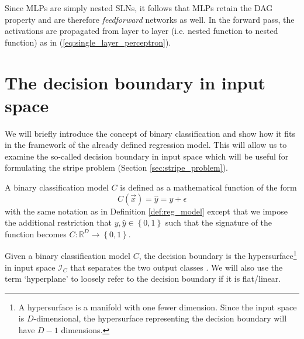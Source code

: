 Since MLPs are simply nested SLNs, it follows that MLPs retain the DAG property and are therefore \textit{feedforward} networks as well.
In the forward pass, the activations are propagated from layer to layer (i.e. nested function to nested function) as in (\ref{eq:single_layer_perceptron}).

\section{The decision boundary in input space}
We will briefly introduce the concept of binary classification and show how it fits in the framework of the already defined regression model.
This will allow us to examine the so-called decision boundary in input space which will be useful for formulating the stripe problem (Section \ref{sec:stripe_problem}).

\begin{definition}
    A binary classification model $C$ is defined as a mathematical function of the form
    \begin{equation}
        C(\vec{x}) = \hat{y} = y + \epsilon
    \end{equation}
    with the same notation as in Definition \ref{def:reg_model} except that we impose the additional restriction that $y,\hat{y}\in \left\{0,1 \right\}$ such that the signature of the function becomes $C:\mathbb{R}^D\rightarrow \left\{0,1\right\}$.
\end{definition}
\begin{definition}
    Given a binary classification model $C$, the decision boundary is the hypersurface\footnote{A hypersurface is a manifold with one fewer dimension. Since the input space is $D$-dimensional, the hypersurface representing the decision boundary will have $D-1$ dimensions.} in input space $\mathcal{I}_C$ that separates the two output classes \cite[p. 723]{russell2010}.
    We will also use the term `hyperplane' to loosely refer to the decision boundary if it is flat/linear.
\end{definition}

